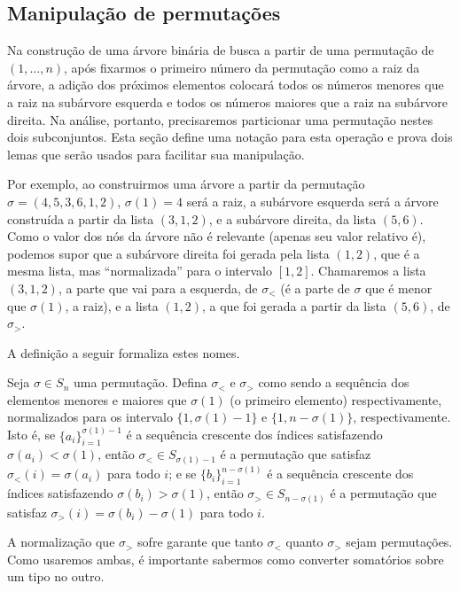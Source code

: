 \subsection{Manipulação de permutações}

Na construção de uma árvore binária de busca
a partir de uma permutação de $(1, \dots, n)$,
após fixarmos o primeiro número da permutação como a raiz da árvore,
a adição dos próximos elementos colocará
todos os números menores que a raiz na subárvore esquerda
e todos os números maiores que a raiz na subárvore direita.
Na análise, portanto,
precisaremos particionar uma permutação nestes dois subconjuntos.
Esta seção define uma notação para esta operação
e prova dois lemas que serão usados para facilitar sua manipulação.

Por exemplo, ao construirmos uma árvore
a partir da permutação $\sigma = (4, 5, 3, 6, 1, 2)$,
$\sigma(1) = 4$ será a raiz,
a subárvore esquerda será a árvore construída a partir da lista $(3, 1, 2)$,
e a subárvore direita, da lista $(5, 6)$.
Como o valor dos nós da árvore não é relevante (apenas seu valor relativo é),
podemos supor que a subárvore direita foi gerada pela lista $(1, 2)$,
que é a mesma lista,
mas ``normalizada'' para o intervalo $[1, 2]$.
Chamaremos a lista $(3, 1, 2)$,
a parte que vai para a esquerda, de $\sigma_<$
(é a parte de $\sigma$ que é menor que $\sigma(1)$, a raiz),
e a lista $(1, 2)$,
a que foi gerada a partir da lista $(5, 6)$, de $\sigma_>$.

A definição a seguir formaliza estes nomes.

\begin{definition}
    Seja $\sigma \in S_n$ uma permutação.
    Defina $\sigma_<$ e $\sigma_>$
    como sendo a sequência dos elementos menores e maiores que $\sigma(1)$
    (o primeiro elemento)
    respectivamente,
    normalizados para os intervalo $\{1, \sigma(1) - 1\}$ e $\{1, n - \sigma(1)\}$,
    respectivamente.
    Isto é,
    se $\{a_i\}_{i = 1}^{\sigma(1)-1}$ é a sequência crescente
    dos índices satisfazendo $\sigma(a_i) < \sigma(1)$,
    então $\sigma_< \in S_{\sigma(1) - 1}$
    é a permutação que satisfaz $\sigma_<(i) = \sigma(a_i)$ para todo $i$;
    e se $\{b_i\}_{i = 1}^{n - \sigma(1)}$ é a sequência crescente
    dos índices satisfazendo $\sigma(b_i) > \sigma(1)$,
    então $\sigma_> \in S_{n - \sigma(1)}$
    é a permutação que satisfaz $\sigma_>(i) = \sigma(b_i) - \sigma(1)$ para todo $i$.
\end{definition}

A normalização que $\sigma_>$ sofre garante que
tanto $\sigma_<$ quanto $\sigma_>$ sejam permutações.
Como usaremos ambas,
é importante sabermos como converter somatórios sobre um tipo no outro.

